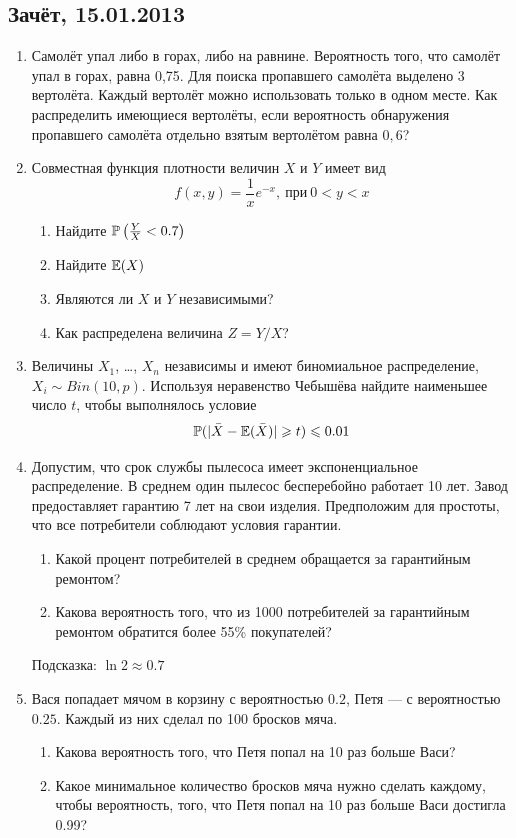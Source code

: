 \documentclass[12pt, a4paper]{article}\usepackage[]{graphicx}\usepackage[]{color}
\begin{document}
\subsection{Зачёт, 15.01.2013}


\begin{enumerate}
\item Самолёт упал либо в горах, либо на равнине. Вероятность того, что самолёт упал в горах, равна 0{,}75. Для поиска пропавшего самолёта выделено 3 вертолёта. Каждый вертолёт можно использовать только в одном месте. Как распределить имеющиеся вертолёты, если вероятность обнаружения пропавшего самолёта отдельно взятым вертолётом равна $0,6$?

\item Совместная функция плотности величин $X$ и $Y$ имеет вид
\[
f(x,y)=\frac{1}{x}e^{-x},\: \text{при}\: 0<y<x
\]

\begin{enumerate}
\item Найдите $\P\left( \frac{Y}{X}<0.7 \right)$
\item Найдите $\E(X)$
\item Являются ли $X$ и $Y$ независимыми?
\item Как распределена величина $Z=Y/X$?
\end{enumerate}

\item Величины $X_1$, \ldots, $X_n$ независимы и имеют биномиальное распределение, $X_i \sim Bin(10,p)$. Используя неравенство Чебышёва найдите наименьшее число $t$, чтобы выполнялось условие
\[
\P( | \bar{X}-\E(\bar{X}) | \geq t )\leq 0.01
\]



\item Допустим, что срок службы пылесоса имеет экспоненциальное распределение. В среднем один
пылесос бесперебойно работает 10 лет. Завод предоставляет гарантию 7 лет на свои изделия.
Предположим для простоты, что все потребители соблюдают условия гарантии.
\begin{enumerate}
\item Какой процент потребителей в среднем обращается за гарантийным ремонтом?
\item Какова вероятность того, что из 1000 потребителей за гарантийным ремонтом обратится
более 55\% покупателей?
\end{enumerate}
Подсказка: $\ln 2\approx 0.7$

\item Вася попадает мячом в корзину с вероятностью $0.2$, Петя — с вероятностью $0.25$. Каждый из них сделал по 100 бросков мяча.
\begin{enumerate}
\item Какова вероятность того, что Петя попал на 10 раз больше Васи?
\item Какое минимальное количество бросков мяча нужно сделать каждому, чтобы вероятность, того, что Петя попал на 10 раз больше Васи достигла 0.99?
\end{enumerate}
\end{enumerate}
\end{document}
